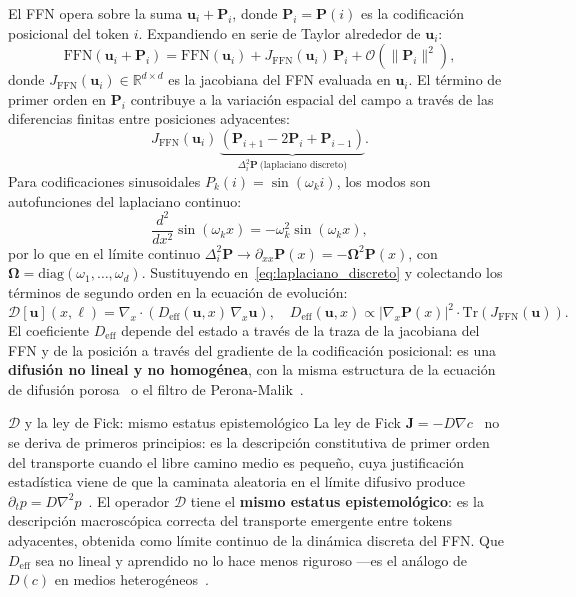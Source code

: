 El FFN opera sobre la suma $\bm{u}_i + \bm{P}_i$, donde $\bm{P}_i
= \bm{P}(i)$ es la codificación posicional del token $i$.
Expandiendo en serie de Taylor alrededor de $\bm{u}_i$:
\begin{equation}
  \mathrm{FFN}(\bm{u}_i + \bm{P}_i)
  = \mathrm{FFN}(\bm{u}_i)
  + J_{\mathrm{FFN}}(\bm{u}_i)\,\bm{P}_i
  + \mathcal{O}(\|\bm{P}_i\|^2),
  \label{eq:taylor_ffn}
\end{equation}
donde $J_{\mathrm{FFN}}(\bm{u}_i) \in \mathbb{R}^{d\times d}$ es
la jacobiana del FFN evaluada en $\bm{u}_i$. El término de primer
orden en $\bm{P}_i$ contribuye a la variación espacial del campo
a través de las diferencias finitas entre posiciones adyacentes:
\begin{equation}
  J_{\mathrm{FFN}}(\bm{u}_i)\,
  \underbrace{(\bm{P}_{i+1} - 2\bm{P}_i + \bm{P}_{i-1})}_{\displaystyle
    \Delta^2_i\bm{P}\ \text{(laplaciano discreto)}}.
  \label{eq:laplaciano_discreto}
\end{equation}
Para codificaciones sinusoidales $P_k(i) = \sin(\omega_k i)$,
los modos son autofunciones del laplaciano continuo:
\begin{equation}
  \frac{d^2}{dx^2}\sin(\omega_k x) = -\omega_k^2\sin(\omega_k x),
  \label{eq:autofuncion_sin}
\end{equation}
por lo que en el límite continuo $\Delta^2_i\bm{P} \to
\partial_{xx}\bm{P}(x) = -\bm{\Omega}^2\bm{P}(x)$, con
$\bm{\Omega} = \mathrm{diag}(\omega_1,\ldots,\omega_d)$.
Sustituyendo en~\eqref{eq:laplaciano_discreto} y colectando los
términos de segundo orden en la ecuación de evolución:
\begin{equation}
  \boxed{
  \mathcal{D}[\bm{u}](x,\ell)
  = \nabla_x \cdot \!\left(D_{\mathrm{eff}}(\bm{u},x)\,
    \nabla_x\bm{u}\right),
  \quad
  D_{\mathrm{eff}}(\bm{u},x)
  \propto |\nabla_x\bm{P}(x)|^2\cdot
  \mathrm{Tr}(J_{\mathrm{FFN}}(\bm{u})).
  }
  \label{eq:op_difusion}
\end{equation}
El coeficiente $D_{\mathrm{eff}}$ depende del estado a través de
la traza de la jacobiana del FFN y de la posición a través del
gradiente de la codificación posicional: es una \textbf{difusión
no lineal y no homogénea}, con la misma estructura de la
ecuación de difusión porosa~\cite{vazquez2007porous} o el filtro
de Perona-Malik~\cite{perona1990scale}.

\begin{fisicaconexion}{$\mathcal{D}$ y la ley de Fick:
mismo estatus epistemológico}
La ley de Fick $\bm{J} = -D\nabla c$~\cite{fick1855ueber} no se
deriva de primeros principios: es la descripción constitutiva de
primer orden del transporte cuando el libre camino medio es
pequeño, cuya justificación estadística viene de que la caminata
aleatoria en el límite difusivo produce $\partial_t p =
D\nabla^2 p$~\cite{einstein1905bewegung}. El operador $\mathcal{D}$
tiene el \textbf{mismo estatus epistemológico}: es la descripción
macroscópica correcta del transporte emergente entre tokens
adyacentes, obtenida como límite continuo de la dinámica discreta
del FFN. Que $D_{\mathrm{eff}}$ sea no lineal y aprendido no lo
hace menos riguroso —es el análogo de $D(c)$ en medios
heterogéneos~\cite{bear1972dynamics}.
\end{fisicaconexion}

